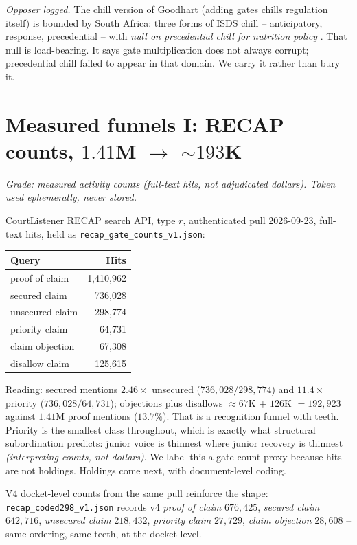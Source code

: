 \textit{Opposer logged.} The chill version of Goodhart (adding gates chills regulation itself) is bounded by South Africa: three forms of ISDS chill -- anticipatory, response, precedential -- with \textit{null on precedential chill for nutrition policy} \citep{pmc8422681}. That null is load-bearing. It says gate multiplication does not always corrupt; precedential chill failed to appear in that domain. We carry it rather than bury it.

\section{Measured funnels I: RECAP counts, $1.41$M $\to$ $\sim 193$K}
\label{sec:recap-funnel}

\textit{Grade: measured activity counts (full-text hits, not adjudicated dollars). Token used ephemerally, never stored.}

CourtListener RECAP search API, type $r$, authenticated pull 2026-09-23, full-text hits, held as \texttt{recap\_gate\_counts\_v1.json}:

\begin{center}
\small
\begin{tabular}{lr}
\toprule
Query & Hits \\
\midrule
proof of claim & 1,410,962 \\
secured claim & 736,028 \\
unsecured claim & 298,774 \\
priority claim & 64,731 \\
claim objection & 67,308 \\
disallow claim & 125,615 \\
\bottomrule
\end{tabular}
\end{center}

Reading: secured mentions $2.46\times$ unsecured ($736{,}028/298{,}774$) and $11.4\times$ priority ($736{,}028/64{,}731$); objections plus disallows $\approx 67$K $+$ $126$K $= 192{,}923$ against $1.41$M proof mentions ($13.7\%$). That is a recognition funnel with teeth. Priority is the smallest class throughout, which is exactly what structural subordination predicts: junior voice is thinnest where junior recovery is thinnest \textit{(interpreting counts, not dollars)}. We label this a gate-count proxy because hits are not holdings. Holdings come next, with document-level coding.

V4 docket-level counts from the same pull reinforce the shape: \texttt{recap\_coded298\_v1.json} records v4 \textit{proof of claim} $676{,}425$, \textit{secured claim} $642{,}716$, \textit{unsecured claim} $218{,}432$, \textit{priority claim} $27{,}729$, \textit{claim objection} $28{,}608$ -- same ordering, same teeth, at the docket level.

